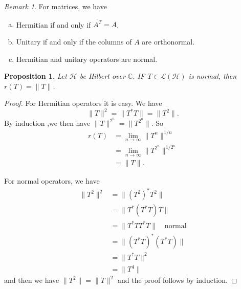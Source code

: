\documentclass[10pt, oneside, reqno]{amsbook}
\theoremstyle{plain}%
\newtheorem{prop}[thm]{Proposition}
\theoremstyle{definition}
\theoremstyle{remark}
\newtheorem*{rem}{Remark}
\newcommand{\Com}{\mathbb{C}}
\begin{document}
\begin{rem}
    For matrices, we have \begin{enumerate}[(a)]
        \item Hermitian if and only if $\overline{A^T} = A$. 
        \item Unitary if and only if the columns of $A$ are orthonormal.
        \item Hermitian and unitary operators are normal.
    \end{enumerate}
\end{rem}

\begin{prop}
    Let $\mathcal H$ be Hilbert over $\Com$.  IF $T \in \mathcal L(\mathcal H)$ is normal, then $r(T) = \| T \|$.  
\end{prop}

\begin{proof}
    For Hermitian operators it is easy.  We have \[
        \| T \|^2 = \| T^* T \| = \| T^2 \|.
    \]  By induction ,we then have $\| T \|^{2^n} = \| T^{2^n} \|$.  So \begin{align*}
        r(T) &= \lim_{n \rightarrow \infty} \| T^n \|^{1/n} \\
            &= \lim_{n \rightarrow \infty} \| T^{2^n} \|^{1/{2^n}} \\
            &= \| T \|.
    \end{align*}  
    
    For normal operators, we have \begin{align*}
        \| T^2 \|^2 &= \| (T^2)^* T^2 \| \\
                    &= \| T^*(T^* T) T \| \\
                    &= \| T^* T T^* T \| \quad \text{normal} \\
                    &= \| (T^* T)^* (T^* T) \|  \\
                    &= \| T^* T \|^2 \\
                    &= \| T^4 \|   
    \end{align*} and then we have $\| T^2 \| = \| T \|^2$ and the proof follows by induction.
\end{proof}
\end{document}
